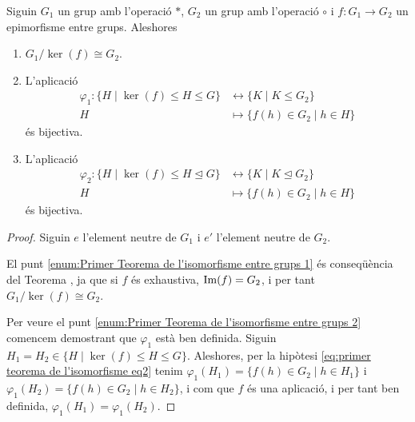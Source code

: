 \documentclass[../Apunts.tex]{subfiles}
\begin{document}
	\begin{theorem}
		\label{thm:Primer Teorema de l'isomorfisme entre grups}
			Siguin \(G_{1}\) un grup amb l'operació \(\ast\), \(G_{2}\) un grup amb l'operació \(\circ\) i \(f\colon G_{1}\to G_{2}\) un epimorfisme entre grups. Aleshores
		\begin{enumerate}
			\item\label{enum:Primer Teorema de l'isomorfisme entre grups 1} \(G_{1}/\ker(f)\cong G_{2}\).
			\item\label{enum:Primer Teorema de l'isomorfisme entre grups 2} L'aplicació
			\begin{align}
			\label{eq:primer teorema de l'isomorfisme eq2}
			\varphi_{1}\colon\{H\mid\ker(f)\leq H\leq G\}&\longleftrightarrow\{K\mid K\leq G_{2}\}\\
			H&\longmapsto\{f(h)\in G_{2}\mid h\in H\}\nonumber
			\end{align}
			és bijectiva.
			\begin{comment}
				\marginpar{Si ningú ve del futur per aturar-te, com de dolenta pot ser la decisió que estàs prenent?}
			\end{comment}
			\item\label{enum:Primer Teorema de l'isomorfisme entre grups 3} L'aplicació
			\begin{align}
			\label{eq:primer teorema de l'isomorfisme eq3}
			\varphi_{2}\colon\{H\mid\ker(f)\leq H\trianglelefteq G\}&\longleftrightarrow\{K\mid K\trianglelefteq G_{2}\}\\
			H&\longmapsto\{f(h)\in G_{2}\mid h\in H\}\nonumber
			\end{align}
			és bijectiva.
		\end{enumerate}
		\begin{proof}
			Siguin \(e\) l'element neutre de \(G_{1}\) i \(e'\) l'element neutre de \(G_{2}\).
			
			El punt \eqref{enum:Primer Teorema de l'isomorfisme entre grups 1} és conseqüència del Teorema , ja que si \(f\) és exhaustiva, \(\operatorname*{Im}(f)=G_{2}\), i per tant \(G_{1}/\ker(f)\cong G_{2}\).
			
			Per veure el punt \eqref{enum:Primer Teorema de l'isomorfisme entre grups 2} comencem demostrant que \(\varphi_{1}\) està ben definida. Siguin \(H_{1}=H_{2}\in\{H\mid\ker(f)\leq H\leq G\}\). Aleshores, per la hipòtesi \eqref{eq:primer teorema de l'isomorfisme eq2} tenim \(\varphi_{1}(H_{1})=\{f(h)\in G_{2}\mid h\in H_{1}\}\) i \(\varphi_{1}(H_{2})=\{f(h)\in G_{2}\mid h\in H_{2}\}\), i com que \(f\) és una aplicació, i per tant ben definida, \(\varphi_{1}(H_{1})=\varphi_{1}(H_{2})\).
			

\end{proof}
\end{theorem}
\end{document}
